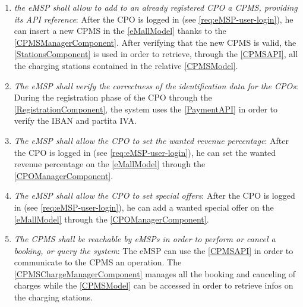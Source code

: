 \begin{enumerate}[label=\textbf{R\arabic*}]
    \label{req:eMSP-cpo-registration}
    \item \textit{the \ac{eMSP} shall allow to add to an already registered \ac{CPO} a \ac{CPMS}, providing its \ac{API} reference}:
    After the \ac{CPO} is logged in (see \ref{req:eMSP-user-login}), he can insert a new \ac{CPMS} in the \ref{eMallModel} thanks to the \ref{CPMSManagerComponent}. After verifying that the new \ac{CPMS} is valid, the \ref{StationsComponent} is used in order to retrieve, through the \ref{CPMSAPI}, all the charging stations contained in the relative \ref{CPMSModel}.
    \label{req:eMSP-add-cpms}
    \item \textit{The \ac{eMSP} shall verify the correctness of the identification data for the \acp{CPO}}:
    During the registration phase of the \ac{CPO} through the \ref{RegistrationComponent}, the system uses the \ref{PaymentAPI} in order to verify the \ac{IBAN} and \gls{partita IVA}.
    \label{req:eMSP-correct-cpo-info}
    \item \textit{The \ac{eMSP} shall allow the \ac{CPO} to set the wanted revenue percentage}:
    After the \ac{CPO} is logged in (see \ref{req:eMSP-user-login}), he can set the wanted revenue percentage on the \ref{eMallModel} through the \ref{CPOManagerComponent}.
    \label{req:eMSP-set-revenue}
    \item \textit{The \ac{eMSP} shall allow the \ac{CPO} to set special offers}:
    After the \ac{CPO} is logged in (see \ref{req:eMSP-user-login}), he can add a wanted special offer on the \ref{eMallModel} through the \ref{CPOManagerComponent}.
    \label{req:eMSP-set-special-offers}
    \item \textit{The \ac{CPMS} shall be reachable by \acp{eMSP} in order to perform or cancel a booking, or query the system}:
    The \ac{eMSP} can use the \ref{CPMSAPI} in order to communicate to the \ac{CPMS} an operation. The \ref{CPMSChargeManagerComponent} manages all the booking and canceling of charges while the \ref{CPMSModel} can be accessed in order to retrieve infos on the charging stations.

\end{enumerate}
